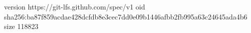 version https://git-lfs.github.com/spec/v1
oid sha256:ba87f859acdae428dcfdb8e3cec7dd0e09b1446afbb2fb995a63c24645ada4b6
size 118823
